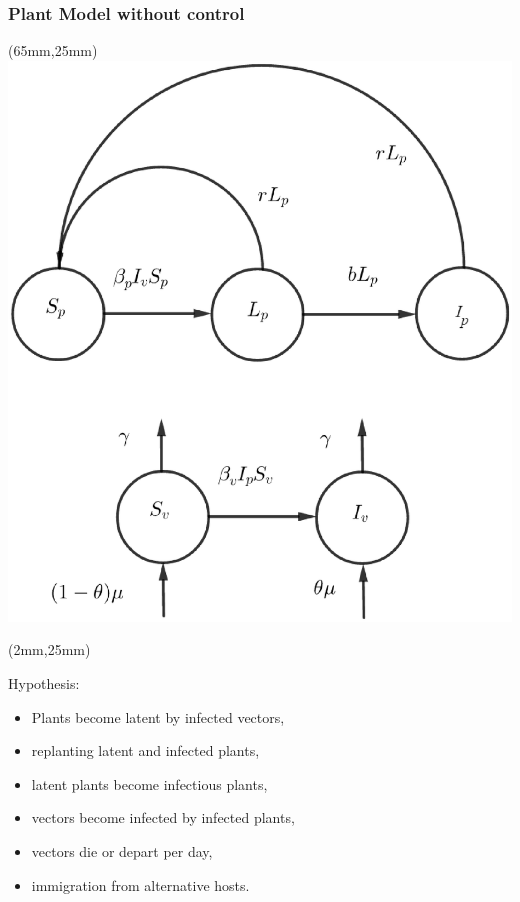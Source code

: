 
\begin{frame}{}
	\begin{bibunit}[abbrv]
		\nocite{Holt1999b}
		\putbib
	\end{bibunit}
\end{frame}

\begin{frame}[plain]
	\frametitle{Plant Model without control}
		\begin{textblock*}{60mm}(65mm,25mm)
			\includegraphics[width=\linewidth]{Feathergraphics/plant_diagram.eps}
		\end{textblock*}
		\begin{textblock*}{60mm}(2mm,25mm)
			\begin{graybox}{Hypothesis:}
				
				\begin{itemize}
					\item<1-> Plants become latent by infected vectors,
					\item<2-> replanting latent and infected plants,
					\item<3-> latent plants become infectious plants,
					\item<4-> vectors become infected by infected plants,
					\item<5-> vectors die or depart per day,
					\item<6-> immigration from alternative hosts.
				\end{itemize}
			\end{graybox}	
		\end{textblock*}
\end{frame}

